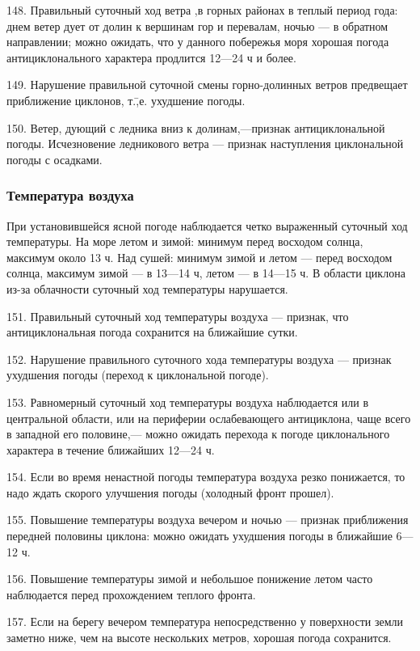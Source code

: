 148. Правильный суточный ход ветра ,в горных районах в теплый период года: днем ветер дует от долин к вершинам гор и перевалам, ночью — в обратном направлении; можно ожидать, что у данного побережья моря хорошая погода антициклонального характера продлится 12—24 ч и более.

149. Нарушение правильной суточной смены горно-долинных ветров предвещает приближение циклонов, т.\=,е. ухудшение погоды.

150. Ветер, дующий с ледника вниз к долинам,—признак антициклональной погоды. Исчезновение ледникового ветра — признак наступления циклональной погоды с осадками.

\subsubsection{Температура воздуха}

При установившейся ясной погоде наблюдается четко выраженный суточный ход температуры. На море летом и зимой: минимум перед восходом солнца, максимум около 13 ч. Над сушей: минимум зимой и летом — перед восходом солнца, максимум зимой — в 13—14 ч, летом — в 14—15 ч. В области циклона из-за облачности суточный ход температуры нарушается.

151. Правильный суточный ход температуры воздуха — признак, что антициклональная погода сохранится на ближайшие сутки.

152. Нарушение правильного суточного хода температуры воздуха — признак ухудшения погоды (переход к циклональной погоде).

153. Равномерный суточный ход температуры воздуха наблюдается или в центральной области, или на периферии ослабевающего антициклона, чаще всего в западной его половине,— можно ожидать перехода к погоде циклонального характера в течение ближайших 12—24 ч.

154. Если во время ненастной погоды температура воздуха резко понижается, то надо ждать скорого улучшения погоды (холодный фронт прошел).

155. Повышение температуры воздуха вечером и ночью — признак приближения передней половины циклона: можно ожидать ухудшения погоды в ближайшие 6— 12 ч.

156. Повышение температуры зимой и небольшое понижение летом часто наблюдается перед прохождением теплого фронта.

157. Если на берегу вечером температура непосредственно у поверхности земли заметно ниже, чем на высоте нескольких метров, хорошая погода сохранится.

